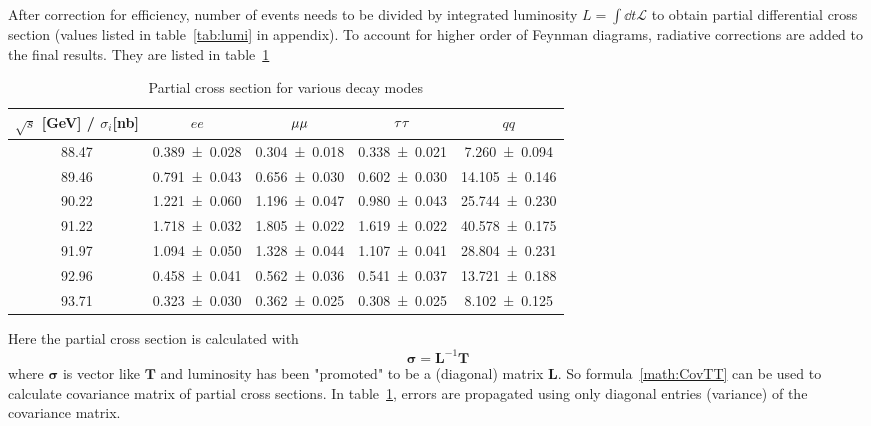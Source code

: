 After correction for efficiency, number of events needs to be divided by integrated luminosity $L = \int\dd{t} \mathcal{L}$ to obtain partial differential cross section (values listed in table~\ref{tab:lumi} in appendix). To account for higher order of Feynman diagrams, radiative corrections are added to the final results. They are listed in table~\ref{tab:p_cross}
\begin{table}[ht]
	\centering
	\begin{tabular}{c cccc}
		\toprule
		$\sqrt{s}$ [\si{\giga\eV}] / $\sigma_i$[\si{\nano\barn}] & $ee$ &  $\mu\mu$ &  $\tau\tau$ & $qq$ \\ 
		\midrule 
		\num{88.47} & \num{0.389 +- 0.028} & \num{0.304 +- 0.018} & \num{0.338 +- 0.021} & \num{7.260 +- 0.094}\\
		\num{89.46} & \num{0.791 +- 0.043} & \num{0.656 +- 0.030} & \num{0.602 +- 0.030} & \num{14.105 +- 0.146}\\
		\num{90.22} & \num{1.221 +- 0.060} & \num{1.196 +- 0.047} & \num{0.980 +- 0.043} & \num{25.744 +- 0.230}\\
		\num{91.22} & \num{1.718 +- 0.032} & \num{1.805 +- 0.022} & \num{1.619 +- 0.022} & \num{40.578 +- 0.175}\\
		\num{91.97} & \num{1.094 +- 0.050} & \num{1.328 +- 0.044} & \num{1.107 +- 0.041} & \num{28.804 +- 0.231}\\
		\num{92.96} & \num{0.458 +- 0.041} & \num{0.562 +- 0.036} & \num{0.541 +- 0.037} & \num{13.721 +- 0.188}\\
		\num{93.71} & \num{0.323 +- 0.030} & \num{0.362 +- 0.025} & \num{0.308 +- 0.025} & \num{8.102 +- 0.125}\\
		\bottomrule
	\end{tabular}
	\caption{Partial cross section for various decay modes\label{tab:p_cross}}
\end{table}

Here the partial cross section is calculated with
\begin{equation}
	\pmb\sigma = \mathbf{L}^{-1} \mathbf{T}
\end{equation}
where $\pmb\sigma$ is vector like $\mathbf T$ and luminosity has been "promoted" to be a (diagonal) matrix $\mathbf L$. So formula~\ref{math:CovTT} can be used to calculate covariance matrix of partial cross sections. In table~\ref{tab:p_cross}, errors are propagated using only diagonal entries (variance) of the covariance matrix.

